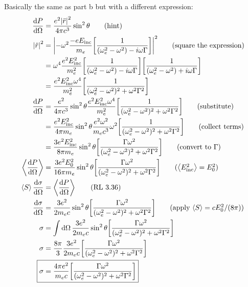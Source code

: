 \documentclass[12pt, letterpaper, twoside]{article}
\newcommand{\avg}[1]{\left\langle #1 \right\rangle}
\begin{document}
Basically the same as part b but with a different expression:
\begin{align*}
        \dv{P}{\Omega} &= \frac{e^2 \abs{\ddot{r}}^2}{4 \pi c^3} \sin^2 \theta \tag{hint} \\
        \abs{\ddot{r}}^2 &= \abs{-\omega^2 \frac{-eE_{\rm inc}}{m_e} \qty[ \frac{1}{(\omega_e^2 - \omega^2) - i \omega \Gamma}]}^2 \tag{square the expression} \\
        &= \omega^4 \frac{e^2 E_{\rm inc}^2}{m_e^2} \qty[ \frac{1}{(\omega_e^2 - \omega^2) - i \omega \Gamma}] \qty[ \frac{1}{(\omega_e^2 - \omega^2) + i \omega \Gamma}] \\
        &= \frac{e^2 E_{\rm inc}^2 \omega^4}{m_e^2} \qty[ \frac{1}{(\omega_e^2 - \omega^2)^2 + \omega^2 \Gamma^2}] \\
        \dv{P}{\Omega} &= \frac{e^2}{4 \pi c^3} \sin^2 \theta \frac{e^2 E_{\rm inc}^2 \omega^4}{m_e^2} \qty[ \frac{1}{(\omega_e^2 - \omega^2)^2 + \omega^2 \Gamma^2}] \tag{substitute} \\
        &= \frac{e^2 E_{\rm inc}^2}{4 \pi m_e} \sin^2 \theta \frac{e^2 \omega^2}{m_e c^3} \omega^2 \qty[ \frac{1}{(\omega_e^2 - \omega^2)^2 + \omega^2 \Gamma^2}] \tag{collect terms} \\
        &= \frac{3 e^2 E_{\rm inc}^2}{8 \pi m_e} \sin^2 \theta \qty[ \frac{\Gamma \omega^2}{(\omega_e^2 - \omega^2)^2 + \omega^2 \Gamma^2}] \tag{convert to $\Gamma$} \\
        \avg{\dv{P}{\Omega}} &= \frac{3 e^2 E_0^2}{16 \pi m_e} \sin^2 \theta \qty[ \frac{\Gamma \omega^2}{(\omega_e^2 - \omega^2)^2 + \omega^2 \Gamma^2}] \tag{$\avg{E_{\rm inc}^2} = E_0^2$} \\
        \avg{S} \dv{\sigma}{\Omega} &= \avg{\dv{P}{\Omega}} \tag{RL 3.36} \\
        \dv{\sigma}{\Omega} &= \frac{3 e^2}{2 m_e c} \sin^2 \theta \qty[ \frac{\Gamma \omega^2}{(\omega_e^2 - \omega^2)^2 + \omega^2 \Gamma^2}] \tag{apply $\avg{S} = c E_0^2 / (8 \pi)$} \\
        \sigma &= \int \dd{\Omega} \frac{3 e^2}{2 m_e c} \sin^2 \theta \qty[ \frac{\Gamma \omega^2}{(\omega_e^2 - \omega^2)^2 + \omega^2 \Gamma^2}] \\
        \sigma &= \frac{8 \pi}{3} \frac{3 e^2}{2 m_e c} \qty[ \frac{\Gamma \omega^2}{(\omega_e^2 - \omega^2)^2 + \omega^2 \Gamma^2}] \\
        \Aboxed{ \sigma &= \frac{4 \pi e^2}{m_e c} \qty[ \frac{\Gamma \omega^2}{(\omega_e^2 - \omega^2)^2 + \omega^2 \Gamma^2}] }
\end{align*}
\end{document}

